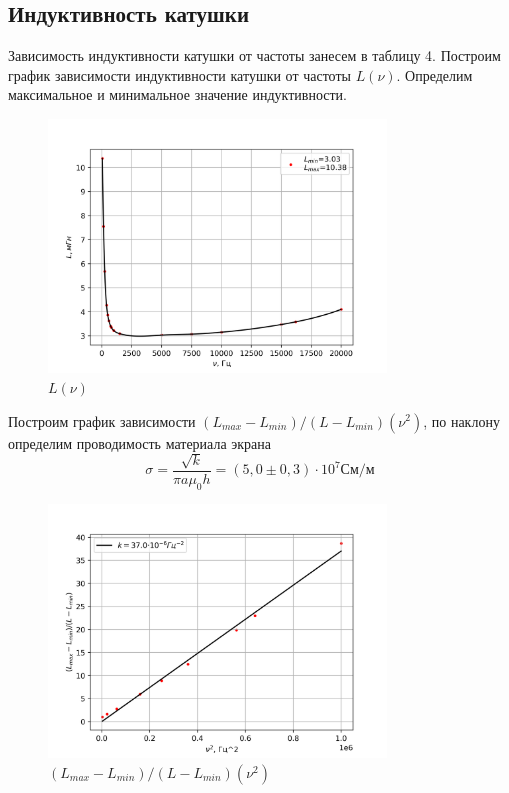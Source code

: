 \documentclass[a4paper, 12pt]{article}
\begin{document}
\subsection*{Индуктивность катушки}
Зависимость индуктивности катушки от частоты занесем в таблицу 4. Построим график зависимости индуктивности катушки от частоты $L(\nu)$. Определим максимальное и минимальное значение индуктивности.
\begin{figure}[H]
    \centering
    \includegraphics[width=0.8\textwidth]{Lnu}
    \caption{$L(\nu)$}
    \label{fig:lnu}
\end{figure}
Построим график зависимости $(L_{max} - L_{min})/(L - L_{min})(\nu^2)$, по наклону определим проводимость материала экрана
\begin{equation}
	\sigma = \frac{\sqrt{k}}{\pi a \mu_0 h} = (5,0 \pm 0,3)\cdot 10^7 \text{См/м}
\end{equation}

\begin{figure}[H]
    \centering
    \includegraphics[width=0.8\textwidth]{lnu2.png}
    \caption{$(L_{max} - L_{min})/(L - L_{min})(\nu^2)$}
    \label{fig:lnu2}
\end{figure}
\end{document}
